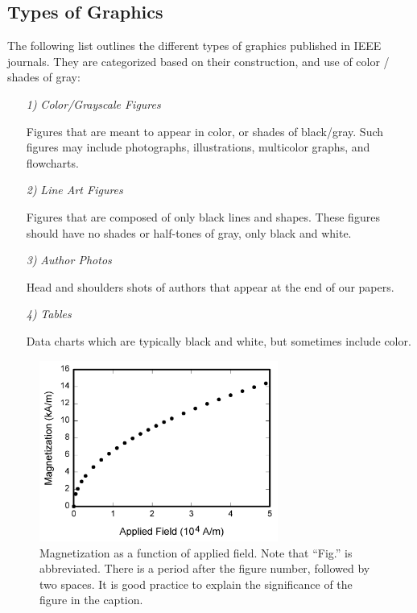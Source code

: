\documentclass[journal]{IEEEtai}
\begin{document}
\subsection{Types of Graphics}

The following list outlines the different types of graphics published in IEEE journals. They are categorized based on their construction, and use of color / shades\vadjust{\pagebreak} of gray:

\begin{enumerate}
\item[{\it 1)}]{\it Color/Grayscale Figures}

Figures that are meant to appear in color, or shades of black/gray. Such figures may include photographs, illustrations, multicolor graphs, and flowcharts.

\item[{\it 2)}]{\it Line Art Figures}

Figures that are composed of only black lines and shapes. These figures should have no shades or half-tones of gray, only black and white.

\item[{\it 3)}]{\it Author Photos}

Head and shoulders shots of authors that appear at the end of our papers.

\item[{\it 4)}]{\it Tables}

Data charts which are typically black and white, but sometimes include color.
\end{enumerate}
\begin{figure}
\centerline{\includegraphics[width=18.5pc]{fig1.png}}
\caption{Magnetization as a function of applied field. Note that ``Fig.'' is abbreviated. There is a period after the figure number, followed by two spaces. It is good practice to explain the significance of the figure in the caption.}
\end{figure}
\end{document}
